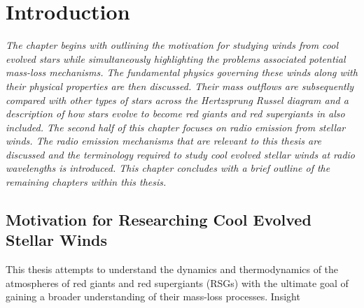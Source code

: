 \chapter{Introduction} \label{chap:1}
\vspace{-1cm}
\textit{The chapter begins with outlining the motivation for studying winds from cool evolved stars while simultaneously highlighting the problems associated potential mass-loss mechanisms. The fundamental physics governing these winds along with their physical properties are then discussed. Their mass outflows are subsequently compared with other types of stars across the Hertzsprung Russel diagram and a description of how stars evolve to become red giants and red supergiants in also included. The second half of this chapter focuses on radio emission from stellar winds. The radio emission mechanisms that are relevant to this thesis are discussed and the terminology required to study cool evolved stellar winds at radio wavelengths is introduced. This chapter concludes with a brief outline of the remaining chapters within this thesis.}

\pagebreak

\section{Motivation for Researching Cool Evolved Stellar Winds}\label{sec:1.1}
This thesis attempts to understand the dynamics and thermodynamics of the atmospheres of red giants and red supergiants (RSGs) with the ultimate goal of gaining a broader understanding of their mass-loss processes. Insight


